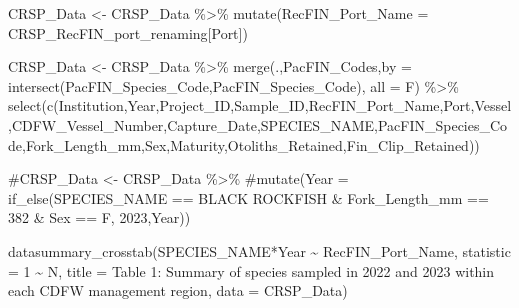 \documentclass[
  letterpaper,
  DIV=11,
  numbers=noendperiod]{scrartcl}
\newenvironment{Shaded}{\begin{snugshade}}{\end{snugshade}}
\newcommand{\AttributeTok}[1]{\textcolor[rgb]{0.40,0.45,0.13}{#1}}
\newcommand{\CommentTok}[1]{\textcolor[rgb]{0.37,0.37,0.37}{#1}}
\newcommand{\DecValTok}[1]{\textcolor[rgb]{0.68,0.00,0.00}{#1}}
\newcommand{\FunctionTok}[1]{\textcolor[rgb]{0.28,0.35,0.67}{#1}}
\newcommand{\NormalTok}[1]{\textcolor[rgb]{0.00,0.23,0.31}{#1}}
\newcommand{\OtherTok}[1]{\textcolor[rgb]{0.00,0.23,0.31}{#1}}
\newcommand{\SpecialCharTok}[1]{\textcolor[rgb]{0.37,0.37,0.37}{#1}}
\newcommand{\StringTok}[1]{\textcolor[rgb]{0.13,0.47,0.30}{#1}}
\begin{document}
\begin{Shaded}
\begin{Highlighting}[]
\NormalTok{CRSP\_Data }\OtherTok{\textless{}{-}}\NormalTok{ CRSP\_Data }\SpecialCharTok{\%\textgreater{}\%} 
  \FunctionTok{mutate}\NormalTok{(}\AttributeTok{RecFIN\_Port\_Name =}\NormalTok{ CRSP\_RecFIN\_port\_renaming[Port])}

\NormalTok{CRSP\_Data }\OtherTok{\textless{}{-}}\NormalTok{ CRSP\_Data }\SpecialCharTok{\%\textgreater{}\%} 
\FunctionTok{merge}\NormalTok{(.,PacFIN\_Codes,}\AttributeTok{by =} \FunctionTok{intersect}\NormalTok{(}\StringTok{\textquotesingle{}PacFIN\_Species\_Code\textquotesingle{}}\NormalTok{,}\StringTok{\textquotesingle{}PacFIN\_Species\_Code\textquotesingle{}}\NormalTok{), }\AttributeTok{all =}\NormalTok{ F) }\SpecialCharTok{\%\textgreater{}\%}
\FunctionTok{select}\NormalTok{(}\FunctionTok{c}\NormalTok{(Institution,Year,Project\_ID,Sample\_ID,RecFIN\_Port\_Name,Port,Vessel,CDFW\_Vessel\_Number,Capture\_Date,SPECIES\_NAME,PacFIN\_Species\_Code,Fork\_Length\_mm,Sex,Maturity,Otoliths\_Retained,Fin\_Clip\_Retained))}

\CommentTok{\#CRSP\_Data \textless{}{-} CRSP\_Data \%\textgreater{}\%}
 \CommentTok{\#mutate(Year = if\_else(SPECIES\_NAME == \textquotesingle{}BLACK ROCKFISH\textquotesingle{} \& Fork\_Length\_mm == 382 \& Sex == \textquotesingle{}F\textquotesingle{}, 2023,Year))}

\FunctionTok{datasummary\_crosstab}\NormalTok{(SPECIES\_NAME}\SpecialCharTok{*}\NormalTok{Year }\SpecialCharTok{\textasciitilde{}}\NormalTok{ RecFIN\_Port\_Name, }\AttributeTok{statistic =} \DecValTok{1} \SpecialCharTok{\textasciitilde{}}\NormalTok{ N, }\AttributeTok{title =} \StringTok{\textquotesingle{}Table 1: Summary of species sampled in 2022 and 2023 within each CDFW management region\textquotesingle{}}\NormalTok{, }\AttributeTok{data =}\NormalTok{ CRSP\_Data)}
\end{Highlighting}
\end{Shaded}
\end{document}
